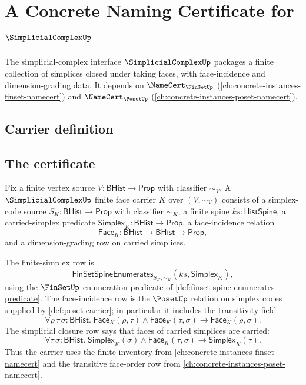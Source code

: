 \chapter{A Concrete Naming Certificate for $\SimplicialComplexUp$}
\label{ch:concrete-instances-simplicialcomplex-namecert}

The simplicial-complex interface $\SimplicialComplexUp$ packages a finite collection of simplices closed under taking faces, with face-incidence and dimension-grading data. It depends on $\NameCert_{\FinSetUp}$ (\autoref{ch:concrete-instances-finset-namecert}) and $\NameCert_{\PosetUp}$ (\autoref{ch:concrete-instances-poset-namecert}).

\section{Carrier definition}
\label{sec:simplicialcomplex-carrier}

\section{The certificate}
\label{sec:simplicialcomplex-certificate}

\begin{definition}
\label{def:simplicialcomplex-finite-face-carrier}
Fix a finite vertex source $V:\mathsf{BHist}\to\mathsf{Prop}$ with classifier $\sim_V$. A $\SimplicialComplexUp$ finite face carrier $K$ over $(V,\sim_V)$ consists of a simplex-code source $S_K:\mathsf{BHist}\to\mathsf{Prop}$ with classifier $\sim_K$, a finite spine $ks:\mathsf{HistSpine}$, a carried-simplex predicate $\mathsf{Simplex}_K:\mathsf{BHist}\to\mathsf{Prop}$, a face-incidence relation
$$
\mathsf{Face}_K:\mathsf{BHist}\to\mathsf{BHist}\to\mathsf{Prop},
$$
and a dimension-grading row on carried simplices.

The finite-simplex row is
$$
\mathsf{FinSetSpineEnumerates}_{S_K,\sim_K}(ks,\mathsf{Simplex}_K),
$$
using the $\FinSetUp$ enumeration predicate of \autoref{def:finset-spine-enumerates-predicate}. The face-incidence row is the $\PosetUp$ relation on simplex codes supplied by \autoref{def:poset-carrier}; in particular it includes the transitivity field
$$
\forall \rho\,\tau\,\sigma:\mathsf{BHist}.\;
\mathsf{Face}_K(\rho,\tau)\land\mathsf{Face}_K(\tau,\sigma)
\to
\mathsf{Face}_K(\rho,\sigma).
$$
The simplicial closure row says that faces of carried simplices are carried:
$$
\forall \tau\,\sigma:\mathsf{BHist}.\;
\mathsf{Simplex}_K(\sigma)\land\mathsf{Face}_K(\tau,\sigma)
\to
\mathsf{Simplex}_K(\tau).
$$
Thus the carrier uses the finite inventory from \autoref{ch:concrete-instances-finset-namecert} and the transitive face-order row from \autoref{ch:concrete-instances-poset-namecert}.
\end{definition}

